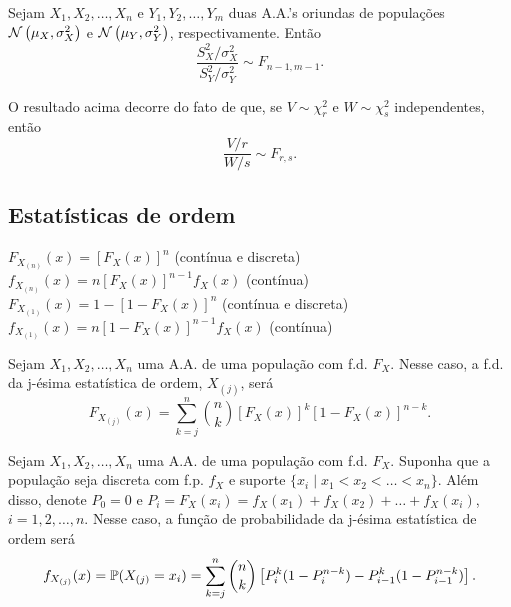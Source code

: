 \begin{theorem}
	Sejam $X_1, X_2, \ldots, X_n$ e $Y_1, Y_2, \ldots, Y_m$ duas A.A.'s oriundas de populações $\normdist{\mu_X, \sigma_X^2}$ e $\normdist{\mu_Y, \sigma_Y^2}$, respectivamente. Então
	\[
	\frac{S_X^2/\sigma_X^2}{S_Y^2/\sigma_Y^2} \sim F_{n-1, m-1}.
	\]
	\begin{note}
		O resultado acima decorre do fato de que, se $V \sim \chi_r^2$ e $W \sim \chi_s^2$ independentes, então
		\[
		\frac{V/r}{W/s} \sim F_{r,s}.
		\]
	\end{note}
\end{theorem}

\subsection{Estatísticas de ordem}


\begin{theorem}
	\leavevmode
	\begin{outline}[enumerate]
		\1 \( F_{X_{(n)}}(x) = \left[ F_X(x) \right]^n \) (contínua e discreta)
		\1 \( f_{X_{(n)}}(x) = n\left[ F_X(x) \right]^{n-1} f_X(x) \) (contínua)
		\1 \( F_{X_{(1)}}(x) = 1-\left[1 - F_X(x) \right]^n \) (contínua e discreta)
		\1 \( f_{X_{(1)}}(x) = n\left[1- F_X(x) \right]^{n-1} f_X(x) \) (contínua)
	\end{outline}
	
\end{theorem}

\begin{theorem}
	Sejam $X_1, X_2, \ldots, X_n$ uma A.A. de uma população com f.d. $F_X$. Nesse caso, a f.d. da j-ésima estatística de ordem, $X_{(j)}$, será
	\[
	F_{X_{(j)}}(x) = \sum_{k=j}^{n} \binom{n}{k} [F_X(x)]^k [1 - F_X(x)]^{n-k}.
	\]
\end{theorem}

\begin{theorem}[Discreta]
	Sejam $X_1, X_2, \ldots, X_n$ uma A.A. de uma população com f.d. $F_X$. Suponha que a população seja discreta com f.p. $f_X$ e suporte $\{x_i \mid x_1 < x_2 < \ldots < x_n\}$. Além disso, denote $P_0 = 0$ e $P_i = F_X(x_i) = f_X(x_1) + f_X(x_2) + \ldots + f_X(x_i)$, $i = 1, 2, \ldots, n$. Nesse caso, a função de probabilidade da j-ésima estatística de ordem será
	\[
	f_{X_{(j)}}(x) = \P(X_{(j)} = x_i) = \sum_{k=j}^{n} \binom{n}{k} \left[ P_i^k (1 - P_i^{n-k}) - P_{i-1}^k (1 - P_{i-1}^{n-k}) \right].
	\]
\end{theorem}

